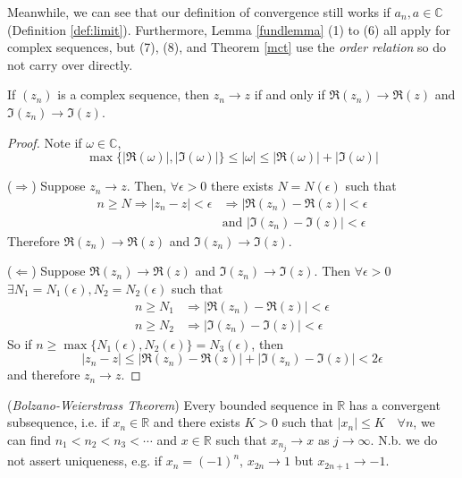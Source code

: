 \documentclass[10pt, a4paper, twoside]{report}
\begin{document}
Meanwhile, we can see that our definition of convergence still works if \(a_n,a\in\mathbb{C}\) (Definition \ref{def:limit}). Furthermore, Lemma \ref{fundlemma} (1) to (6) all apply for complex sequences, but (7), (8), and Theorem \ref{mct} use the \emph{order relation} so do not carry over directly.
\begin{lemma}
    If \((z_n)\) is a complex sequence, then \(z_n\to z\) if and only if \(\Re(z_n)\to\Re(z)\) and \(\Im(z_n)\to\Im(z)\). 
    \label{lemma:complex_conv}
\end{lemma}
\begin{proof}
    Note if \(\omega\in\mathbb{C}\),
    \[\max\{|\Re(\omega)|,|\Im(\omega)|\}\leq|\omega|\leq|\Re(\omega)|+|\Im(\omega)|\]
    
    (\(\Rightarrow\)) Suppose \(z_n\to z\). Then, \(\forall\epsilon>0\) there exists \(N=N(\epsilon)\) such that
    \begin{align*}
        n\geq N\Rightarrow|z_n-z|<\epsilon&\Rightarrow|\Re(z_n)-\Re(z)|<\epsilon \\
        &\text{and } |\Im(z_n)-\Im(z)|<\epsilon
    \end{align*} 
    Therefore  \(\Re(z_n)\to\Re(z)\) and \(\Im(z_n)\to\Im(z)\).

    (\(\Leftarrow\)) Suppose \(\Re(z_n)\to\Re(z)\) and \(\Im(z_n)\to\Im(z)\). Then \(\forall\epsilon>0\) \(\exists N_1=N_1(\epsilon),N_2=N_2(\epsilon)\) such that 
    \begin{align*}
        n\geq N_1&\Rightarrow|\Re(z_n)-\Re(z)|<\epsilon \\
        n\geq N_2&\Rightarrow|\Im(z_n)-\Im(z)|<\epsilon
    \end{align*}
    So if \(n\geq\max\{N_1(\epsilon),N_2(\epsilon)\}=N_3(\epsilon)\), then
    \[|z_n-z|\leq|\Re(z_n)-\Re(z)|+|\Im(z_n)-\Im(z)|<2\epsilon\]
    and therefore \(z_n\to z\).
\end{proof}
\begin{theorem}
    (\emph{Bolzano-Weierstrass Theorem}) Every bounded sequence in \(\mathbb{R}\) has a convergent subsequence, i.e. if \(x_n\in\mathbb{R}\) and there exists \(K>0\) such that \(|x_n|\leq K\quad\forall n\), we can find \(n_1<n_2<n_3<\cdots\) and \(x\in\mathbb{R}\) such that \(x_{n_j}\to x\) as \(j\to\infty\). 
    N.b. we do not assert uniqueness, e.g. if \(x_n=(-1)^n\), \(x_{2n}\to 1\) but \(x_{2n+1}\to -1\).
    \label{thm:bwt}
\end{theorem}
\end{document}
